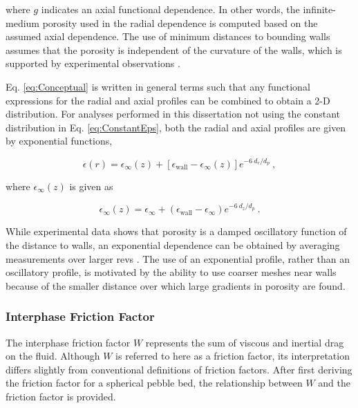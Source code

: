 \noindent where \(g\) indicates an axial functional dependence. In other words, the infinite-medium porosity used in the radial dependence is computed based on the assumed axial dependence. The use of minimum distances to bounding walls assumes that the porosity is independent of the curvature of the walls, which is supported by experimental observations \cite{duToit2008,benenati}. 

Eq. \eqref{eq:Conceptual} is written in general terms such that any functional expressions for the radial and axial profiles can be combined to obtain a 2-D distribution. For analyses performed in this dissertation not using the constant distribution in Eq. \eqref{eq:ConstantEps}, both the radial and axial profiles are given by exponential functions,

\begin{equation}
\label{eq:ExpPorosity2}
\epsilon(r)=\epsilon_\infty(z)+\left\lbrack\epsilon_\text{wall}-\epsilon_\infty(z)\right\rbrack e^{-6\ d_r/d_p}\ ,
\end{equation}

\noindent where \(\epsilon_\infty(z)\) is given as

\begin{equation}
\epsilon_\infty(z)=\epsilon_\infty+\left(\epsilon_\text{wall}-\epsilon_\infty\right)e^{-6\ d_z/d_p}\ .
\end{equation}

\noindent While experimental data shows that porosity is a damped oscillatory function of the distance to walls, an exponential dependence can be obtained by averaging measurements over larger \glspl{rev} \cite{duToit2008,keil,vortmeyer}. The use of an exponential profile, rather than an oscillatory profile, is motivated by the ability to use coarser meshes near walls because of the smaller distance over which large gradients in porosity are found.

\subsubsection{Interphase Friction Factor}
\label{sec:W}

The interphase friction factor \(W\) represents the sum of viscous and inertial drag on the fluid. Although \(W\) is referred to here as a friction factor, its interpretation differs slightly from conventional definitions of friction factors. After first deriving the friction factor for a spherical pebble bed, the relationship between \(W\) and the friction factor is provided.

